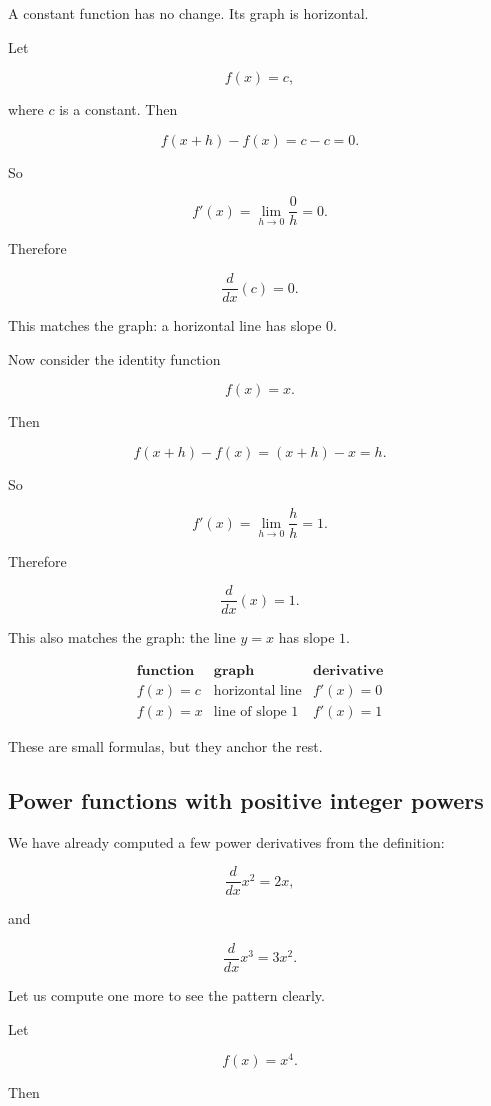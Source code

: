 A constant function has no change.  Its graph is horizontal.

Let

\[
f(x)=c,
\]

where \(c\) is a constant.  Then

\[
f(x+h)-f(x)=c-c=0.
\]

So

\[
f'(x)
=
\lim_{h\to0}\frac{0}{h}
=
0.
\]

Therefore

\[
\boxed{
\frac{d}{dx}(c)=0.
}
\]

This matches the graph: a horizontal line has slope \(0\).

Now consider the identity function

\[
f(x)=x.
\]

Then

\[
f(x+h)-f(x)
=
(x+h)-x
=
h.
\]

So

\[
f'(x)
=
\lim_{h\to0}\frac{h}{h}
=
1.
\]

Therefore

\[
\boxed{
\frac{d}{dx}(x)=1.
}
\]

This also matches the graph: the line \(y=x\) has slope \(1\).

\[
\begin{array}{c|c|c}
\textbf{function} & \textbf{graph} & \textbf{derivative} \\ \hline
f(x)=c & \text{horizontal line} & f'(x)=0 \\[2pt]
f(x)=x & \text{line of slope }1 & f'(x)=1
\end{array}
\]

These are small formulas, but they anchor the rest.

\subsection{Power functions with positive integer powers}
\label{subsec:power-functions-positive-integers}

We have already computed a few power derivatives from the definition:

\[
\frac{d}{dx}x^2=2x,
\]

and

\[
\frac{d}{dx}x^3=3x^2.
\]

Let us compute one more to see the pattern clearly.

Let

\[
f(x)=x^4.
\]

Then

